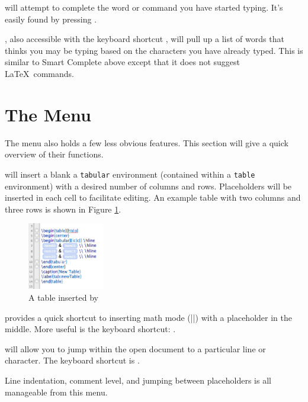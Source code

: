  will attempt to complete the word or command you have started typing. It's easily found by pressing \keys{\esckey}.

, also accessible with the keyboard shortcut , will pull up a list of words that \texnicle thinks you may be typing based on the characters you have already typed. This is similar to Smart Complete above except that it does not suggest \LaTeX\ commands.

\section[The Editor Menu]{The  Menu}
\label{reference.editortable}
The  menu also holds a few less obvious \texnicle features. This section will give a quick overview of their functions.

 will insert a blank a \verb|tabular| environment (contained within a \verb|table| environment) with a desired number of columns and rows. Placeholders will be inserted in each cell to facilitate editing. An example table with two columns and three rows is shown in Figure \ref{fig:texnicle-inserttable}.

\begin{figure}[htbp]
\centering
\includegraphics[width=0.3\textwidth]{TeXnicle-Images/texnicle-inserttable.png}
\caption{A table inserted by \texnicle}
\label{fig:texnicle-inserttable}
\end{figure}

 provides a quick shortcut to inserting math mode (|$ $|) with a placeholder in the middle. More useful is the keyboard shortcut: .

 will allow you to jump within the open document to a particular line or character. The keyboard shortcut is .

Line indentation, comment level, and jumping between placeholders is all manageable from this menu.

